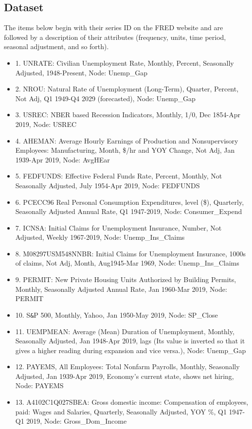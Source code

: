 \documentclass{article}
\begin{document}
\subsection{Dataset}

The items below begin with their series ID on the FRED website and are followed by a description of their attributes (frequency, units, time period, seasonal adjustment, and so forth).
\begin{itemize}
	\item 1.	UNRATE: Civilian Unemployment Rate, Monthly, Percent, Seasonally Adjusted, 1948-Present, Node: Unemp\_Gap
	\item 2.	NROU: Natural Rate of Unemployment (Long-Term), Quarter, Percent, Not Adj, Q1 1949-Q4 2029  (forecasted), Node: Unemp\_Gap
	\item 3.	USREC: NBER based Recession Indicators, Monthly, 1/0, Dec 1854-Apr 2019, Node: USREC
	\item 4. AHEMAN: Average Hourly Earnings of Production and Nonsupervisory Employees: Manufacturing, Month, \$/hr and YOY Change, Not Adj, Jan 1939-Apr 2019, Node: AvgHEar
	\item 5.	FEDFUNDS: Effective Federal Funds Rate, Percent, Monthly, Not Seasonally Adjusted, July 1954-Apr 2019, Node: FEDFUNDS
	\item 6.	PCECC96 Real Personal Consumption Expenditures, level (\$), Quarterly, Seasonally Adjusted Annual Rate, Q1 1947-2019, Node: Consumer\_Expend
	\item 7.	ICNSA: Initial Claims for Unemployment Insurance, Number, Not Adjusted, Weekly 1967-2019, Node: Unemp\_Ins\_Claims
	\item 8.	M08297USM548NNBR: Initial Claims for Unemployment Insurance, 1000s of claims, Not Adj, Month, Aug1945-Mar 1969, Node: Unemp\_Ins\_Claims
	\item 9.	PERMIT: New Private Housing Units Authorized by Building Permits, Monthly, Seasonally Adjusted Annual Rate, Jan 1960-Mar 2019, Node: PERMIT
	\item 10. S\verb|&|P 500, Monthly, Yahoo, Jan 1950-May 2019, Node: SP\_Close
	\item 11. UEMPMEAN: Average (Mean) Duration of Unemployment, Monthly, Seasonally Adjusted, Jan 1948-Apr 2019, lags (Its value is inverted so that it gives a higher reading during expansion and vice versa.), Node: Unemp\_Gap
	\item 12. PAYEMS, All Employees: Total Nonfarm Payrolls, Monthly, Seasonally Adjusted, Jan 1939-Apr 2019, Economy’s current state, shows net hiring, Node: PAYEMS
	\item 13. A4102C1Q027SBEA: Gross domestic income: Compensation of employees, paid: Wages and Salaries, Quarterly, Seasonally Adjusted, YOY \%, Q1 1947-Q1 2019, Node: Gross\_Dom\_Income
\end{itemize}
\end{document}
